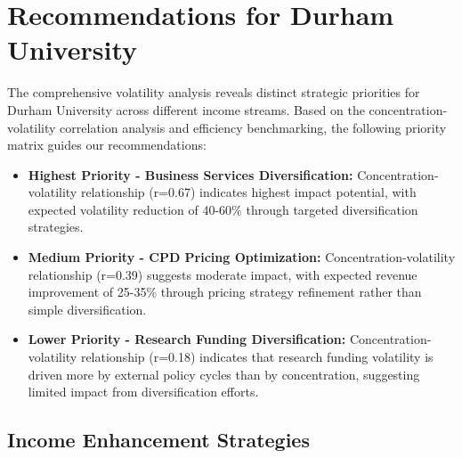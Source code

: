 \documentclass[journal,onecolumn, 10pt,draftclsnofoot]{IEEEtran}
\begin{document}
\section{Recommendations for Durham University}
The comprehensive volatility analysis reveals distinct strategic priorities for Durham University across different income streams. Based on the concentration-volatility correlation analysis and efficiency benchmarking, the following priority matrix guides our recommendations:

\begin{itemize}
    \item \textbf{Highest Priority - Business Services Diversification:} Concentration-volatility relationship (r=0.67) indicates highest impact potential, with expected volatility reduction of 40-60\% through targeted diversification strategies.
    
    \item \textbf{Medium Priority - CPD Pricing Optimization:} Concentration-volatility relationship (r=0.39) suggests moderate impact, with expected revenue improvement of 25-35\% through pricing strategy refinement rather than simple diversification.
    
    \item \textbf{Lower Priority - Research Funding Diversification:} Concentration-volatility relationship (r=0.18) indicates that research funding volatility is driven more by external policy cycles than by concentration, suggesting limited impact from diversification efforts.
\end{itemize}

\subsection{Income Enhancement Strategies}
\end{document}
